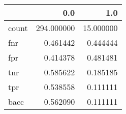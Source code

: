 \begin{tabular}{lrr}
\toprule
{} &         0.0 &        1.0 \\
\midrule
count &  294.000000 &  15.000000 \\
fnr   &    0.461442 &   0.444444 \\
fpr   &    0.414378 &   0.481481 \\
tnr   &    0.585622 &   0.185185 \\
tpr   &    0.538558 &   0.111111 \\
bacc  &    0.562090 &   0.111111 \\
\bottomrule
\end{tabular}
